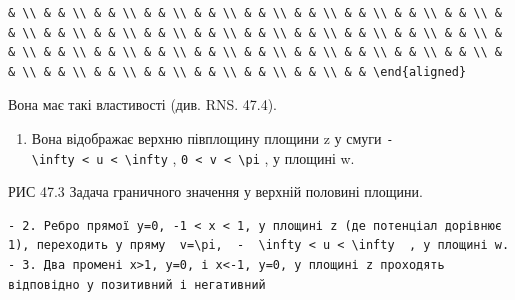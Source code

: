 \documentclass[
  ukrainian,
]{article}
\providecommand{\tightlist}{%
  \setlength{\itemsep}{0pt}\setlength{\parskip}{0pt}}
\begin{document}
\begin{verbatim}
& \\ & & \\ & & \\ & & \\ & & \\ & & \\ & & \\ & & \\ & & \\ & & \\ & & \\ & & \\ & & \\ & & \\ & & \\ & & \\ & & \\ & & \\ & & \\ & & \\ & & \\ & & \\ & & \\ & & \\ & & \\ & & \\ & & \\ & & \\ & & \\ & & \\ & & \\ & & \\ & & \\ & & \\ & & \\ & & \\ & & \\ & & \end{aligned}
\end{verbatim}

Вона має такі властивості (див. RNS. 47.4).

\begin{enumerate}
\def\labelenumi{\arabic{enumi}.}
\tightlist
\item
  Вона відображає верхню півплощину площини z у смуги
  \texttt{-\textbackslash{}infty\ \textless{}\ u\ \textless{}\ \textbackslash{}infty}
  , \texttt{0\ \textless{}\ v\ \textless{}\ \textbackslash{}pi} , у
  площині w.
\end{enumerate}

РИС 47.3 Задача граничного значення у верхній половині площини.

\begin{verbatim}
- 2. Ребро прямої y=0, -1 < x < 1, у площині z (де потенціал дорівнює 1), переходить у пряму  v=\pi,  -  \infty < u < \infty  , у площині w. - 3. Два промені x>1, y=0, і x<-1, y=0, у площині z проходять відповідно у позитивний і негативний
\end{verbatim}
\end{document}
